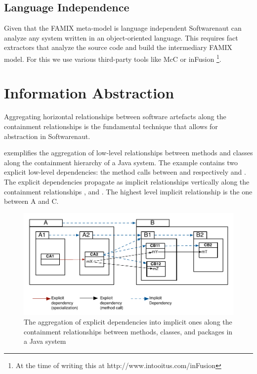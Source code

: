 \documentclass[preprint,12pt]{elsarticle}
\begin{document}
\subsection {Language Independence}
Given that the FAMIX meta-model is language independent Softwarenaut can analyze any system written in an object-oriented language. This requires fact extractors that analyze the source code and build the intermediary FAMIX model. For this we use various third-party tools like McC \cite{pepi-mcc} or inFusion \footnote{At the time of writing this at http://www.intooitus.com/inFusion}.


\newpage
\section {Information Abstraction}
\label{sec:org}

Aggregating horizontal relationships between software artefacts along the containment relationships is the fundamental technique that allows for abstraction in Softwarenaut. 

 exemplifies the aggregation 
of low-level relationships between methods and classes 
along the containment hierarchy 
of a Java system. The example contains two explicit low-level dependencies: 
the method calls between  and respectively  and . 
The explicit dependencies propagate as implicit relationships vertically along the containment relationships ,  and . The highest level implicit relationship is the one between A and C. 


\begin{figure}[h]
\begin{center}
\includegraphics[width=\linewidth]{DependencyAggregation}
\caption{The aggregation of explicit dependencies into implicit ones along the containment relationships between methods, classes, and packages in a Java system}
\end{center}
\end{figure}
\end{document}
